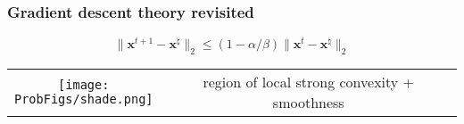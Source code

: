 \documentclass[compress,
mathserif,wide,%
]{beamer}
\newcommand{\ProbFigs}{figure}
\begin{document}
\begin{frame}
	\frametitle{Gradient descent theory revisited}

{

\begin{varblock}[0.7\textwidth]{}
	\vspace{-0.5em}
	\[
		\|\bm{x}^{t+1} -\bm{x}^\natural\|_2 \leq \left(1- \alpha / \beta \right)\|\bm{x}^{t} -\bm{x}^\natural\|_2
	\]
\end{varblock}
}



\begin{center}
	\begin{tabular}{cc}
 	 	\texttt{[image: \\ProbFigs/shade.png]} 	&  region of local strong convexity + smoothness \tabularnewline
	\end{tabular} 
\end{center}

\vspace{-1em}

\begin{columns}

\begin{column}{0.38\textwidth}
\begin{figure}
\end{figure}
\end{column}


\end{columns}


\end{frame}
\end{document}
